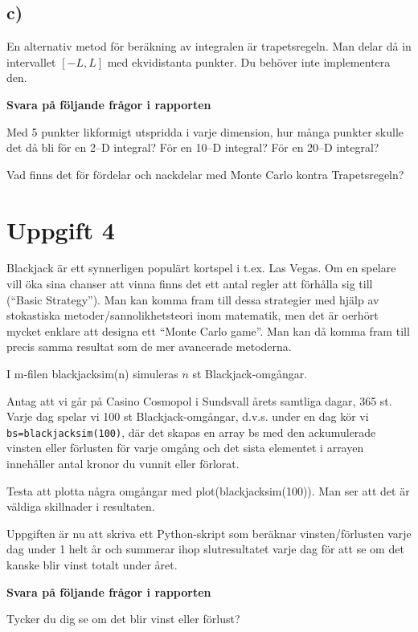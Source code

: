 \documentclass[a4paper]{article}
\begin{document}
\subsection{c)}
En alternativ metod för beräkning av integralen är trapetsregeln.
Man delar då in intervallet \([-L, L]\) med ekvidistanta punkter.
Du behöver inte implementera den.

\textbf{Svara på följande frågor i rapporten}

Med 5 punkter likformigt utspridda i varje dimension, hur många punkter skulle
det då bli för en 2--D integral? För en 10--D integral? För en 20--D integral?

Vad finns det för fördelar och nackdelar med Monte Carlo kontra Trapetsregeln?

\newpage
\section{Uppgift 4}

Blackjack är ett synnerligen populärt kortspel i t.ex. Las Vegas.
Om en spelare vill öka sina chanser att vinna finns det ett antal regler att
förhålla sig till (``Basic Strategy''). Man kan komma fram till dessa strategier
med hjälp av stokastiska metoder/sannolikhetsteori inom matematik, men det är oerhört
mycket enklare att designa ett ``Monte Carlo game''. Man kan då komma fram till precis
samma resultat som de mer avancerade metoderna.

I m-filen blackjacksim(n) simuleras \(n\) st Blackjack-omgångar.

Antag att vi går på Casino Cosmopol i Sundsvall årets samtliga dagar, 365 st.
Varje dag spelar vi 100 st Blackjack-omgångar, d.v.s. under en dag kör vi \lstinline{bs=blackjacksim(100)},
där det skapas en array bs med den ackumulerade vinsten eller förlusten för varje omgång
och det sista elementet i arrayen innehåller antal kronor du vunnit eller förlorat.

Testa att plotta några omgångar med plot(blackjacksim(100)). Man ser att det är väldiga skillnader i resultaten.

Uppgiften är nu att skriva ett Python-skript som beräknar vinsten/förlusten varje dag under 1
helt år och summerar ihop slutresultatet varje dag för att se om det kanske blir vinst totalt under året.

\textbf{Svara på följande frågor i rapporten}

Tycker du dig se om det blir vinst eller förlust?
\end{document}
